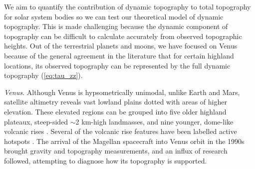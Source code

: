 We aim to quantify the contribution of dynamic topography to total topography for solar system bodies so we can test our theoretical model of dynamic topography. This is made challenging because the dynamic component of topography can be difficult to calculate accurately from observed topographic heights. Out of the terrestrial planets and moons, we have focused on Venus because of the general agreement in the literature that for certain highland locations, its observed topography can be represented by the full dynamic topography (\ref{eq:tau_zz}). 



\vspace{0.5cm}

\textit{\color{teal1} Venus.} Although Venus is hypsometrically unimodal, unlike Earth and Mars, satellite altimetry reveals vast lowland plains dotted with areas of higher elevation. These elevated regions can be grouped into five older highland plateaux, steep-sided $\sim$2 km-high landmasses, and nine younger, dome-like volcanic rises \citep{Phillips1998}. Several of the volcanic rise features have been labelled active hotspots \citep{Kiefer1991, Smrekar1991, Grimm1992, Smrekar1994, Stofan1995, Smrekar2010}. The arrival of the Magellan spacecraft into Venus orbit in the 1990s brought gravity and topography measurements, and an influx of research followed, attempting to diagnose how its topography is supported. 

